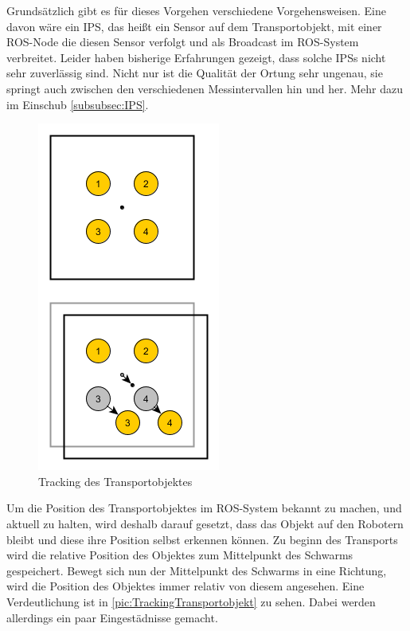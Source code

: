 Grundsätzlich gibt es für dieses Vorgehen verschiedene Vorgehensweisen. Eine davon wäre ein \ac{IPS}, das heißt ein Sensor auf dem Transportobjekt, mit einer \ac{ROS}-Node die diesen Sensor verfolgt und als Broadcast im \ac{ROS}-System verbreitet. Leider haben bisherige Erfahrungen gezeigt, dass solche \ac{IPS}s nicht sehr zuverlässig sind. Nicht nur ist die Qualität der Ortung sehr ungenau, sie springt auch zwischen den verschiedenen Messintervallen hin und her. Mehr dazu im Einschub \autoref{subsubsec:IPS}.

\begin{figure}
	\includegraphics[width=\pictureWidthSmall,keepaspectratio]{graphics/Transport/Tracking.png}
	\caption{Tracking des Transportobjektes}
	\label{pic:TrackingTransportobjekt}
\end{figure}

Um die Position des Transportobjektes im \ac{ROS}-System bekannt zu machen, und aktuell zu halten, wird deshalb darauf gesetzt, dass das Objekt auf den Robotern bleibt und diese ihre Position selbst erkennen können. Zu beginn des Transports wird die relative Position des Objektes zum Mittelpunkt des Schwarms gespeichert. Bewegt sich nun der Mittelpunkt des Schwarms in eine Richtung, wird die Position des Objektes immer relativ von diesem angesehen. Eine Verdeutlichung ist in \autoref{pic:TrackingTransportobjekt} zu sehen. Dabei werden allerdings ein paar Eingestädnisse gemacht.

